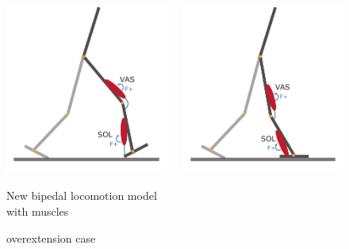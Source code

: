 \documentclass[10pt]{beamer}
\begin{document}
\begin{frame}
\begin{figure}
\begin{overprint}
				\begin{columns}
					\begin{column}{.55\textwidth}
						\centering
						\includegraphics[height=.5\textheight]{images/new_model/stance/muscle_vas_sol.pdf}
						\caption{New bipedal locomotion model with muscles}
					\end{column}
					\begin{column}{.5\textwidth}
						\centering
						\includegraphics[height=.5\textheight]{images/new_model/stance/muscle_vas_sol_overextension.pdf}
						\caption{overextension case}
					\end{column}  
				\end{columns}
				

\end{overprint}
\end{figure}
\end{frame}
\end{document}

